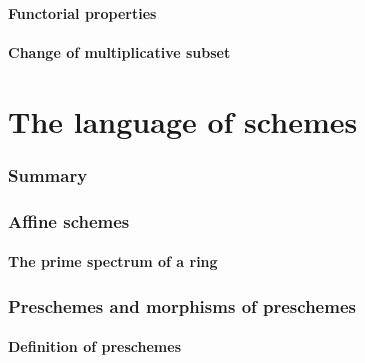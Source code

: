 \documentclass[10pt,oneside]{amsart}
\begin{document}
        \subsection{Functorial properties}
        

        \subsection{Change of multiplicative subset}
        

\clearpage


\setcounter{subsection}{0}
\part{The language of schemes}
    
    \section*{Summary}
    

    \section{Affine schemes}
       
       \subsection{The prime spectrum of a ring}



    \section{Preschemes and morphisms of preschemes}

        \subsection{Definition of preschemes}
        
\end{document}
